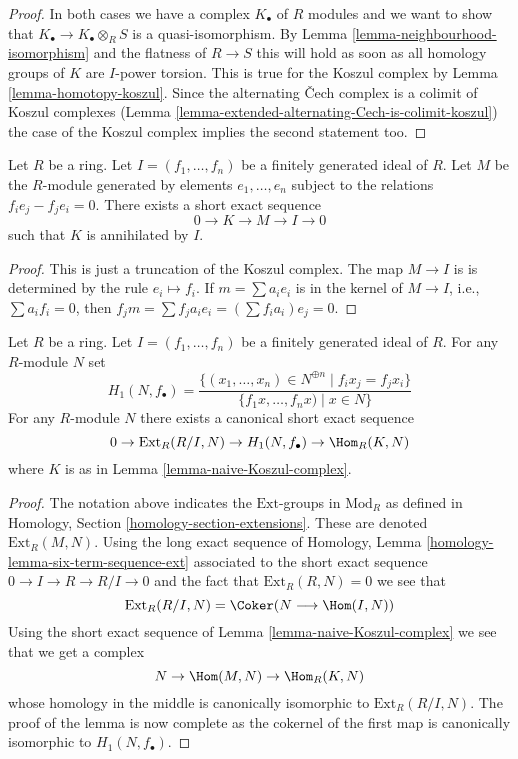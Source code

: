 \begin{proof}
In both cases we have a complex $K_\bullet$ of $R$ modules and we want
to show that $K_\bullet \to K_\bullet \otimes_R S$ is a quasi-isomorphism.
By Lemma \ref{lemma-neighbourhood-isomorphism} and the flatness of
$R \to S$ this will hold as soon as all homology groups of $K$ are $I$-power
torsion. This is true for the Koszul complex by
Lemma \ref{lemma-homotopy-koszul}.
Since the alternating {\v C}ech complex is a colimit of Koszul
complexes (Lemma \ref{lemma-extended-alternating-Cech-is-colimit-koszul})
the case of the Koszul complex implies the second statement too.
\end{proof}

\begin{lemma}
\label{lemma-naive-Koszul-complex}
Let $R$ be a ring. Let $I = (f_1, \ldots, f_n)$ be a finitely generated ideal
of $R$. Let $M$ be the $R$-module generated by elements
$e_1, \ldots, e_n$ subject to the relations $f_i e_j - f_j e_i = 0$.
There exists a short exact sequence
$$
0 \to K \to M \to I \to 0
$$
such that $K$ is annihilated by $I$.
\end{lemma}

\begin{proof}
This is just a truncation of the Koszul complex.
The map $M \to I$ is is determined by the rule $e_i \mapsto f_i$. If
$m = \sum a_i e_i$ is in the kernel of $M \to I$, i.e., $\sum a_i f_i = 0$,
then $f_j m = \sum f_j a_i e_i = (\sum f_i a_i) e_j = 0$.
\end{proof}

\begin{lemma}
\label{lemma-explicit-ext}
Let $R$ be a ring. Let $I = (f_1, \ldots, f_n)$ be a finitely generated ideal
of $R$. For any $R$-module $N$ set
$$
H_1(N, f_\bullet) =
\frac{\{(x_1, \ldots, x_n) \in N^{\oplus n} \mid f_i x_j = f_j x_i \}}
{\{f_1x, \ldots, f_nx) \mid x \in N\}}
$$
For any $R$-module $N$ there exists a canonical short exact sequence
$$
0 \to \text{Ext}_R(R/I, N) \to H_1(N, f_\bullet) \to \Hom_R(K, N)
$$
where $K$ is as in
Lemma \ref{lemma-naive-Koszul-complex}.
\end{lemma}

\begin{proof}
The notation above indicates the $\text{Ext}$-groups in $\text{Mod}_R$
as defined in
Homology, Section \ref{homology-section-extensions}.
These are denoted $\text{Ext}_R(M, N)$. Using the long exact sequence of
Homology, Lemma \ref{homology-lemma-six-term-sequence-ext}
associated to the short exact sequence $0 \to I \to R \to R/I \to 0$
and the fact that $\text{Ext}_R(R, N) = 0$ we see that
$$
\text{Ext}_R(R/I, N) =
\Coker(N \longrightarrow \Hom(I, N))
$$
Using the short exact sequence of
Lemma \ref{lemma-naive-Koszul-complex}
we see that we get a complex
$$
N \to \Hom(M, N) \to \Hom_R(K, N)
$$
whose homology in the middle is canonically isomorphic to
$\text{Ext}_R(R/I, N)$. The proof of the lemma is now complete
as the cokernel of the first map
is canonically isomorphic to $H_1(N, f_\bullet)$.
\end{proof}

